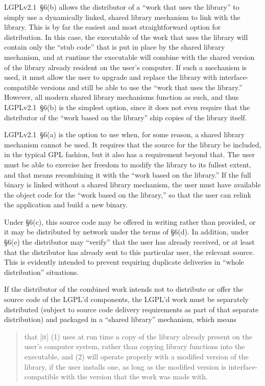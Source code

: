 LGPLv2.1~\S6(b) allows the distributor of a ``work that uses the library'' to
simply use a dynamically linked, shared library mechanism to link with the
library. This is by far the easiest and most straightforward option for
distribution. In this case, the executable of the work that uses the
library will contain only the ``stub code'' that is put in place by the
shared library mechanism, and at runtime the executable will combine with
the shared version of the library already resident on the user's computer.
If such a mechanism is used, it must allow the user to upgrade and
replace the library with interface-compatible versions and still be able
to use the ``work that uses the library.''  However, all modern shared
library mechanisms function as such, and thus LGPLv2.1~\S6(b) is the simplest
option, since it does not even require that the distributor of the ``work 
based on the library'' ship copies of the library itself.

LGPLv2.1~\S6(a) is the option to use when, for some reason, a shared library
mechanism cannot be used. It requires that the source for the library be
included, in the typical GPL fashion, but it also has a requirement beyond
that. The user must be able to exercise her freedom to modify the library
to its fullest extent, and that means recombining it with the ``work based
on the library.''  If the full binary is linked without a shared library
mechanism, the user must have available the object code for the ``work
based on the library,'' so that the user can relink the application and
build a new binary.


Under \S6(c), this source code may be offered in writing rather than provided,
or it may be distributed by network under the terms of \S6(d). In addition,
under \S6(e) the distributor may ``verify'' that the user has already received,
or at least that the distributor has already sent to this particular user,
the relevant source. This is evidently intended to prevent requiring
duplicate deliveries in ``whole distribution'' situations.

If the distributor of the combined work intends not to distribute or offer
the source code of the LGPL’d components, the LGPL’d work must be separately
distributed (subject to source code delivery requirements as part of that
separate distribution) and packaged in a ``shared library'' mechanism, which
means

\begin{quotation}
    that [it] (1) uses at run time a copy of the library already present on
    the user’s computer system, rather than copying library functions into
    the executable, and (2) will operate properly with a modified version of
    the library, if the user installs one, as long as the modified version is
    interface-compatible with the version that the work was made with.
\end{quotation}


